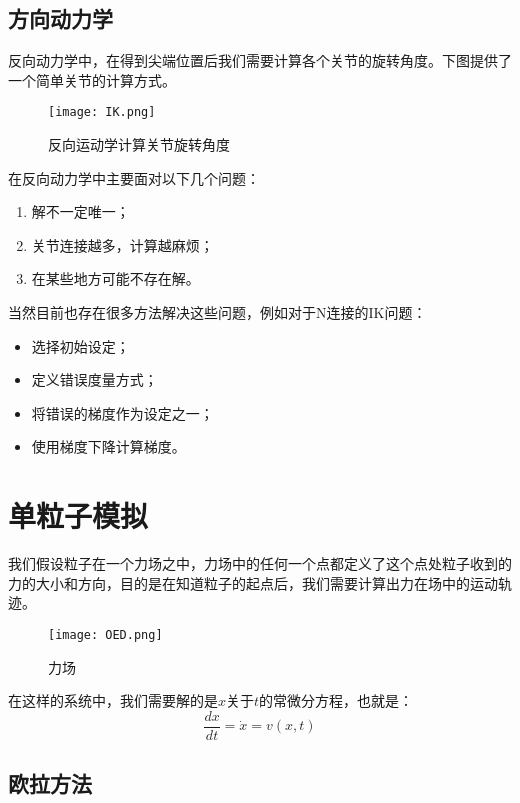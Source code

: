 \documentclass[openany]{progbookcn}
\begin{document}
\subsection{方向动力学}

反向动力学中，在得到尖端位置后我们需要计算各个关节的旋转角度。下图提供了一个简单关节的计算方式。

\begin{figure}[H]
	\centering
	\texttt{[image: IK.png]}
	\caption{反向运动学计算关节旋转角度}
	\label{fig:ik}
\end{figure}

在反向动力学中主要面对以下几个问题：
\begin{enumerate}
	\item 解不一定唯一；
	\item 关节连接越多，计算越麻烦；
	\item 在某些地方可能不存在解。
\end{enumerate}

当然目前也存在很多方法解决这些问题，例如对于N连接的IK问题：

\begin{itemize}
	\item 选择初始设定；
	\item 定义错误度量方式；
	\item 将错误的梯度作为设定之一；
	\item 使用梯度下降计算梯度。
\end{itemize}

\section{单粒子模拟}

我们假设粒子在一个力场之中，力场中的任何一个点都定义了这个点处粒子收到的力的大小和方向，目的是在知道粒子的起点后，我们需要计算出力在场中的运动轨迹。

\begin{figure}[H]
	\centering
	\texttt{[image: OED.png]}
	\caption{力场}
	\label{fig:OED}
\end{figure}

在这样的系统中，我们需要解的是$x$关于$t$的常微分方程，也就是：
\begin{equation}
	\frac{d x}{d t}=\dot{x}=v(x, t)
\end{equation}

\subsection{欧拉方法}
\end{document}
